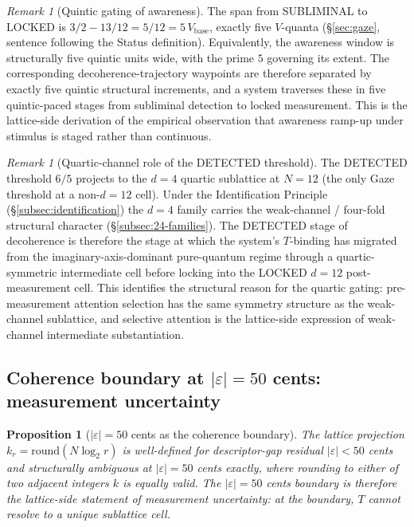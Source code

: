 \documentclass[11pt,a4paper]{article}
\newtheorem{proposition}[theorem]{Proposition}
\theoremstyle{definition}
\theoremstyle{remark}
\newtheorem{remark}[theorem]{Remark}
\begin{document}
\begin{remark}[Quintic gating of awareness]\label{rem:quintic-gating}
The span from SUBLIMINAL to LOCKED is $3/2 - 13/12 = 5/12 = 5\,V_{\mathrm{base}}$, exactly five $V$-quanta (\S\ref{sec:gaze}, sentence following the Status definition). Equivalently, the awareness window is structurally five quintic units wide, with the prime $5$ governing its extent. The corresponding decoherence-trajectory waypoints are therefore separated by exactly five quintic structural increments, and a system traverses these in five quintic-paced stages from subliminal detection to locked measurement. This is the lattice-side derivation of the empirical observation that awareness ramp-up under stimulus is staged rather than continuous.
\end{remark}

\begin{remark}[Quartic-channel role of the DETECTED threshold]\label{rem:quartic-channel}
The DETECTED threshold $6/5$ projects to the $d=4$ quartic sublattice at $N=12$ (the only Gaze threshold at a non-$d=12$ cell). Under the Identification Principle (\S\ref{subsec:identification}) the $d=4$ family carries the weak-channel / four-fold structural character (\S\ref{subsec:24-families}). The DETECTED stage of decoherence is therefore the stage at which the system's $T$-binding has migrated from the imaginary-axis-dominant pure-quantum regime through a quartic-symmetric intermediate cell before locking into the LOCKED $d=12$ post-measurement cell. This identifies the structural reason for the quartic gating: pre-measurement attention selection has the same symmetry structure as the weak-channel sublattice, and selective attention is the lattice-side expression of weak-channel intermediate substantiation.
\end{remark}

\subsection{Coherence boundary at \texorpdfstring{$|\varepsilon|=50$}{|epsilon|=50} cents: measurement uncertainty}\label{subsec:coherence-boundary}

\begin{proposition}[$|\varepsilon|=50$ cents as the coherence boundary]\label{prop:coherence-boundary}
The lattice projection $k_{r} = \mathrm{round}(N\log_{2}r)$ is well-defined for descriptor-gap residual $|\varepsilon| < 50$ cents and structurally ambiguous at $|\varepsilon| = 50$ cents exactly, where rounding to either of two adjacent integers $k$ is equally valid. The $|\varepsilon|=50$ cents boundary is therefore the lattice-side statement of measurement uncertainty: at the boundary, $T$ cannot resolve to a unique sublattice cell.
\end{proposition}
\end{document}
